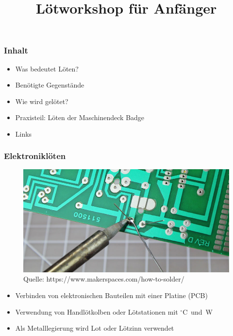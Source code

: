\documentclass[10pt]{beamer}
\title[soldering-workshop] %
{Lötworkshop für Anfänger}
\begin{document}
    \maketitle
    
    \begin{frame}
    \frametitle{Inhalt}
    \begin{itemize}
    	\item{Was bedeutet Löten?}
    	\item{Benötigte Gegenstände}
    	\item{Wie wird gelötet?}
    	\item{Praxisteil: Löten der Maschinendeck Badge}
    	\item{Links}
    \end{itemize}
	\end{frame}

	\begin{frame}
	\frametitle{Elektroniklöten}
	\begin{figure}[hbtp]
		\centering
		\includegraphics[width=\linewidth*2/3]{images/elektronikloeten.jpg}
		\caption{Quelle: https://www.makerspaces.com/how-to-solder/}
	\end{figure}
	\begin{itemize}
		\item{Verbinden von elektronischen Bauteilen mit einer Platine (PCB)}
		\item{Verwendung von Handlötkolben oder Lötstationen mit \unit[300 - 450]{$^\circ$C} und \unit[30 - 100]{W}}
		\item{Als Metalllegierung wird Lot oder Lötzinn verwendet}
	\end{itemize}
	\end{frame}
\end{document}

